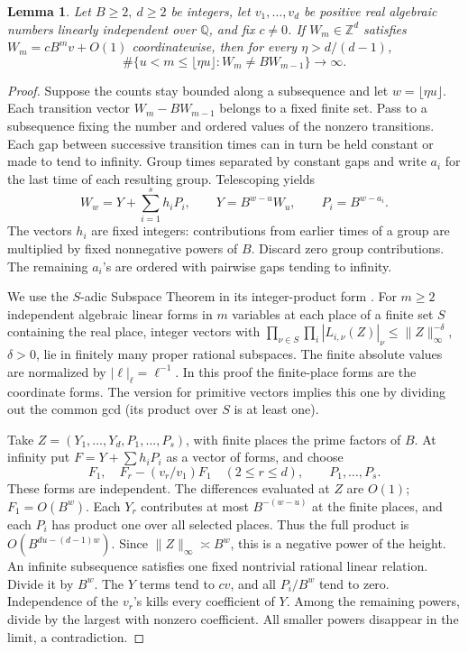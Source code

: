 \documentclass[11pt,reqno,a4paper]{amsart}
\newtheorem{lemma}[theorem]{Lemma}
\theoremstyle{remark}
\begin{document}
\begin{lemma}\label{lem:transitions}
Let \(B\ge2,\ d\ge2\) be integers, let \(v_1,\ldots,v_d\) be
positive real algebraic numbers linearly independent over \(\mathbb Q\),
and fix \(c\ne0\). If \(W_m\in\mathbb Z^d\) satisfies
\(W_m=cB^m v+O(1)\) coordinatewise, then for every \(\eta>d/(d-1)\),
\[
 \#\{u<m\le\lfloor\eta u\rfloor:W_m\ne BW_{m-1}\}\longrightarrow\infty .
\]
\end{lemma}
\begin{proof}
Suppose the counts stay bounded along a subsequence and let
\(w=\lfloor\eta u\rfloor\). Each transition vector \(W_m-BW_{m-1}\)
belongs to a fixed finite set. Pass to a subsequence fixing the
number and ordered values of the nonzero transitions. Each gap
between successive transition times can in turn be held constant
or made to tend to infinity. Group times separated by constant
gaps and write \(a_i\) for the last time of each resulting group.
Telescoping yields
\[
 W_w=Y+\sum_{i=1}^s h_i P_i,\qquad
 Y=B^{w-u}W_u,\qquad P_i=B^{w-a_i}.
\]
The vectors \(h_i\) are fixed integers: contributions from earlier
times of a group are multiplied by fixed nonnegative powers of \(B\).
Discard zero group contributions. The remaining \(a_i\)'s are ordered
with pairwise gaps tending to infinity.

We use the \(S\)-adic Subspace Theorem in its integer-product form
\cite{schlickewei}. For \(m\ge2\) independent algebraic linear forms
in \(m\) variables at each place of a finite set \(S\) containing
the real place, integer vectors with
\(\prod_{\nu\in S}\prod_i |L_{i,\nu}(Z)|_\nu
 \le \|Z\|_\infty^{-\delta}\), \(\delta>0\), lie in finitely many
proper rational subspaces. The finite absolute values are normalized
by \(|\ell|_\ell=\ell^{-1}\). In this proof the finite-place forms
are the coordinate forms. The version for primitive vectors implies
this one by dividing out the common gcd (its product over \(S\) is
at least one).

Take \(Z=(Y_1,\ldots,Y_d,P_1,\ldots,P_s)\), with finite places the
prime factors of \(B\). At infinity put \(F=Y+\sum h_i P_i\) as
a vector of forms, and choose
\[
 F_1,\quad F_r-(v_r/v_1)F_1\quad(2\le r\le d),
     \qquad P_1,\ldots,P_s .
\]
These forms are independent. The differences evaluated at \(Z\)
are \(O(1)\); \(F_1=O(B^w)\). Each \(Y_r\) contributes at most
\(B^{-(w-u)}\) at the finite places, and each \(P_i\) has product
one over all selected places. Thus the full product is
\(O(B^{du-(d-1)w})\). Since \(\|Z\|_\infty\asymp B^w\), this is a
negative power of the height. An infinite subsequence satisfies
one fixed nontrivial rational linear relation. Divide it by \(B^w\).
The \(Y\) terms tend to \(cv\), and all \(P_i/B^w\) tend to zero.
Independence of the \(v_r\)'s kills every coefficient of \(Y\).
Among the remaining powers, divide by the largest with nonzero
coefficient. All smaller powers disappear in the limit, a contradiction.
\end{proof}
\end{document}
